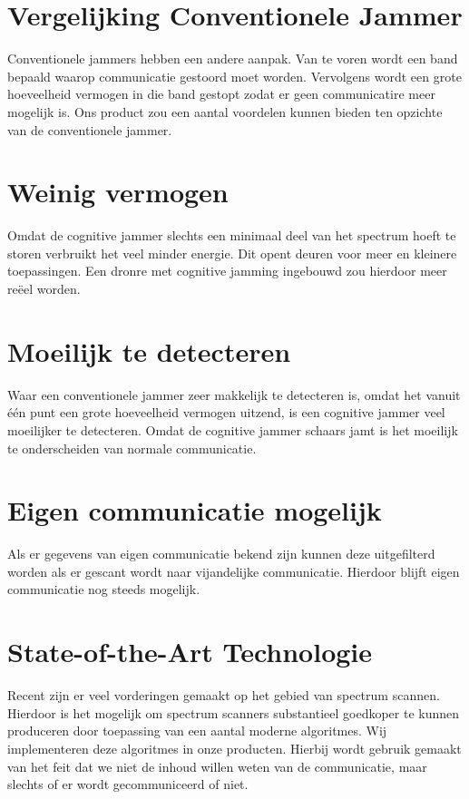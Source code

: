 \documentclass[oneside, a4paper, openany]{memoir}
\begin{document}
\section{Vergelijking Conventionele Jammer}
Conventionele jammers hebben een andere aanpak. Van te voren wordt een band bepaald waarop communicatie gestoord moet worden. Vervolgens wordt een grote hoeveelheid vermogen in die band gestopt zodat er geen communicatire meer mogelijk is. Ons product zou een aantal voordelen kunnen bieden ten opzichte van de conventionele jammer.

\section{Weinig vermogen}
Omdat de cognitive jammer slechts een minimaal deel van het spectrum hoeft te storen verbruikt het veel minder energie. Dit opent deuren voor meer en kleinere toepassingen. Een dronre met cognitive jamming ingebouwd zou hierdoor meer re\"eel worden.

\section{Moeilijk te detecteren}
Waar een conventionele jammer zeer makkelijk te detecteren is, omdat het vanuit \'e\'en punt een grote hoeveelheid vermogen uitzend, is een cognitive jammer veel moeilijker te detecteren. Omdat de cognitive jammer schaars jamt is het moeilijk te onderscheiden van normale communicatie.

\section{Eigen communicatie mogelijk}
Als er gegevens van eigen communicatie bekend zijn kunnen deze uitgefilterd worden als er gescant wordt naar vijandelijke communicatie. Hierdoor blijft eigen communicatie nog steeds mogelijk.

\section{State-of-the-Art Technologie}
Recent zijn er veel vorderingen gemaakt op het gebied van spectrum scannen. Hierdoor is het mogelijk om spectrum scanners substantieel goedkoper te kunnen produceren door toepassing van een aantal moderne algoritmes. Wij implementeren deze algoritmes in onze producten. Hierbij wordt gebruik gemaakt van het feit dat we niet de inhoud willen weten van de communicatie, maar slechts of er wordt gecommuniceerd of niet.
\end{document}
